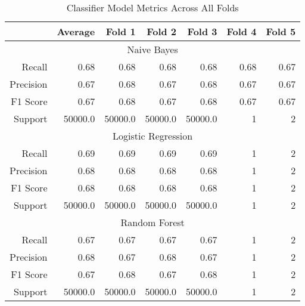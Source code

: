\begin{table}[h]
    \centering
    \begin{tabular}{r|r|r|r|r|r|r}
        & Average & Fold 1 & Fold 2 & Fold 3 & Fold 4 & Fold 5 \\\hline
        \multicolumn{7}{c}{Naive Bayes} \\\hline
        Recall      & 0.68 & 0.68 & 0.68 & 0.68 & 0.68 & 0.67\\
        Precision   & 0.67 & 0.68 & 0.67 & 0.68 & 0.67 & 0.67\\
        F1 Score    & 0.67 & 0.68 & 0.67 & 0.68 & 0.67 & 0.67\\
        Support     & 50000.0 & 50000.0 & 50000.0 & 50000.0  & 1 & 2\\\hline
        \multicolumn{7}{c}{Logistic Regression} \\\hline
        Recall      & 0.69 & 0.69 & 0.69 & 0.69  & 1 & 2\\
        Precision   & 0.68 & 0.68 & 0.68 & 0.68  & 1 & 2\\
        F1 Score    & 0.68 & 0.68 & 0.68 & 0.68  & 1 & 2\\
        Support     & 50000.0 & 50000.0 & 50000.0 & 50000.0  & 1 & 2\\\hline
        \multicolumn{7}{c}{Random Forest} \\\hline
        Recall      & 0.67 & 0.67 & 0.67 & 0.67  & 1 & 2\\
        Precision   & 0.68 & 0.67 & 0.68 & 0.67  & 1 & 2\\
        F1 Score    & 0.67 & 0.68 & 0.67 & 0.68  & 1 & 2\\
        Support     & 50000.0 & 50000.0 & 50000.0 & 50000.0  & 1 & 2\\
    \end{tabular}
    \caption{Classifier Model Metrics Across All Folds}
    \label{tab:combined_model_metrics}
\end{table}
